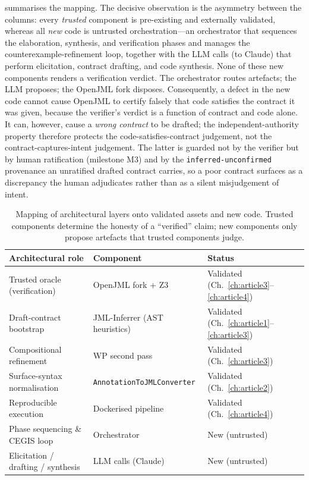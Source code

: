  summarises the mapping. The decisive observation is the asymmetry between the columns: every \emph{trusted} component is pre-existing and externally validated, whereas all \emph{new} code is untrusted orchestration---an orchestrator that sequences the elaboration, synthesis, and verification phases and manages the counterexample-refinement loop, together with the LLM calls (to Claude) that perform elicitation, contract drafting, and code synthesis. None of these new components renders a verification verdict. The orchestrator routes artefacts; the LLM proposes; the OpenJML fork disposes. Consequently, a defect in the new code cannot cause OpenJML to certify falsely that code satisfies the contract it was given, because the verifier's verdict is a function of contract and code alone. It can, however, cause a \emph{wrong contract} to be drafted; the independent-authority property therefore protects the code-satisfies-contract judgement, not the contract-captures-intent judgement. The latter is guarded not by the verifier but by human ratification (milestone M3) and by the \texttt{inferred-unconfirmed} provenance an unratified drafted contract carries, so a poor contract surfaces as a discrepancy the human adjudicates rather than as a silent misjudgement of intent.

\begin{table}[t]
  \centering
  \caption{Mapping of architectural layers onto validated assets and new code. Trusted components determine the honesty of a ``verified'' claim; new components only propose artefacts that trusted components judge.}
  \label{tab:a5-components}
  \begin{tabular}{@{}lll@{}}
    \toprule
    Architectural role & Component & Status \\
    \midrule
    Trusted oracle (verification) & OpenJML fork + Z3~\cite{cok2014openjml,demoura2008z3} & Validated (Ch.~\ref{ch:article3}--\ref{ch:article4}) \\
    Draft-contract bootstrap & JML-Inferrer (AST heuristics)~\cite{edmonds_article3} & Validated (Ch.~\ref{ch:article1}--\ref{ch:article3}) \\
    Compositional refinement & WP second pass~\cite{edmonds_article3} & Validated (Ch.~\ref{ch:article3}) \\
    Surface-syntax normalisation & \texttt{AnnotationToJMLConverter} & Validated (Ch.~\ref{ch:article2}) \\
    Reproducible execution & Dockerised pipeline~\cite{edmonds_article4} & Validated (Ch.~\ref{ch:article4}) \\
    \midrule
    Phase sequencing \& CEGIS loop & Orchestrator & New (untrusted) \\
    Elicitation / drafting / synthesis & LLM calls (Claude) & New (untrusted) \\
    \bottomrule
  \end{tabular}
\end{table}

